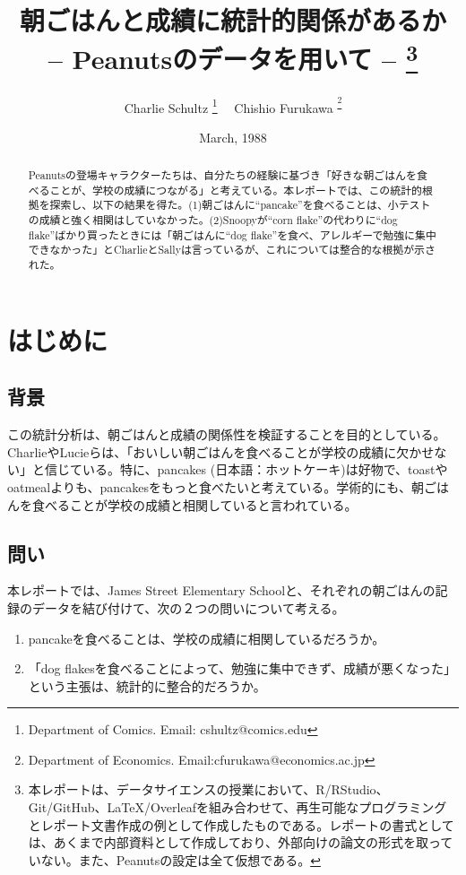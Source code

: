 \documentclass[xelatex,ja=standard]{bxjsarticle}
\title{朝ごはんと成績に統計的関係があるか \\ -- Peanutsのデータを用いて -- \thanks{本レポートは、データサイエンスの授業において、R/RStudio、Git/GitHub、LaTeX/Overleafを組み合わせて、再生可能なプログラミングとレポート文書作成の例として作成したものである。レポートの書式としては、あくまで内部資料として作成しており、外部向けの論文の形式を取っていない。また、Peanutsの設定は全て仮想である。}}
\author{Charlie Schultz
\thanks{Department of Comics. Email: cshultz@comics.edu}  \ \  Chishio Furukawa
\textsuperscript\thanks{Department of Economics. Email:cfurukawa@economics.ac.jp}}
\date{March, 1988}
\begin{document}
\renewcommand\footnotelayout{\small}
\sffamily\mdseries

\maketitle

\vspace{-10pt}\begin{abstract}
\begin{spacing}{1}
\noindent 
Peanutsの登場キャラクターたちは、自分たちの経験に基づき「好きな朝ごはんを食べることが、学校の成績につながる」と考えている。本レポートでは、この統計的根拠を探索し、以下の結果を得た。(1)朝ごはんに``pancake''を食べることは、小テストの成績と強く相関はしていなかった。(2)Snoopyが``corn flake''の代わりに``dog flake''ばかり買ったときには「朝ごはんに``dog flake''を食べ、アレルギーで勉強に集中できなかった」とCharlieとSallyは言っているが、これについては整合的な根拠が示された。\\

\end{spacing}
\end{abstract}

\newpage

\section{はじめに}

\subsection{背景} 

この統計分析は、朝ごはんと成績の関係性を検証することを目的としている。CharlieやLucieらは、「おいしい朝ごはんを食べることが学校の成績に欠かせない」と信じている。特に、pancakes (日本語：ホットケーキ)は好物で\citep{peanutsbook}、toastやoatmealよりも、pancakesをもっと食べたいと考えている。学術的にも、朝ごはんを食べることが学校の成績と相関していると言われている\citep{Chandler1995}。

\subsection{問い}

本レポートでは、James Street Elementary Schoolと、それぞれの朝ごはんの記録のデータを結び付けて、次の２つの問いについて考える。

\begin{enumerate}
\item pancakeを食べることは、学校の成績に相関しているだろうか。
\item 「dog flakesを食べることによって、勉強に集中できず、成績が悪くなった」という主張は、統計的に整合的だろうか。
\end{enumerate}
\end{document}
